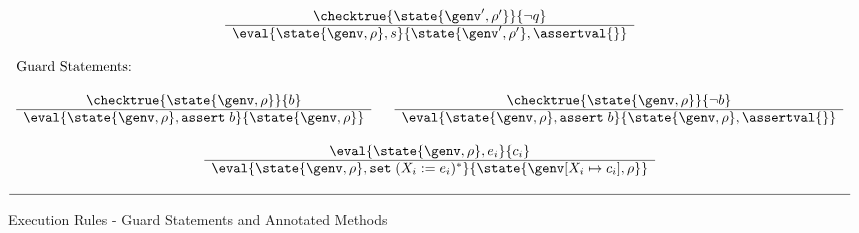\begin{figure}[tbp]
\begin{displaymath}
\begin{array}{c}
\begin{array}{c}
\checktrue{\state{\genv',\rho'}}{\neg q} \\
\hline
\eval{\state{\genv,\rho},s}{\state{\genv',\rho'},\assertval{}} 
\end{array} \\
\ \\
\multicolumn{1}{l}{\mbox{Guard Statements:}} \\
\ \\
\begin{array}{c}
\checktrue{\state{\genv,\rho}}{b} \\
\hline
\eval{\state{\genv,\rho},\texttt{assert}\;b}{\state{\genv,\rho}}
\end{array}
\;\;\;\;\;\;
\begin{array}{c}
\checktrue{\state{\genv,\rho}}{\neg b} \\
\hline
\eval{\state{\genv,\rho},\texttt{assert}\;b}{\state{\genv,\rho},\assertval{}}
\end{array} \\
\ \\
\begin{array}{c}
\eval{\state{\genv,\rho},e_i}{c_i} \\
\hline
\eval{\state{\genv,\rho},\texttt{set}\;(X_i:=e_i)^*}{\state{\genv[X_i \mapsto c_i],\rho}}
\end{array} \\
\ \\
\hline
\end{array}
\end{displaymath}
\caption{Execution Rules - Guard Statements and Annotated Methods}\label{fig:bigstep-annotations}
\end{figure}
